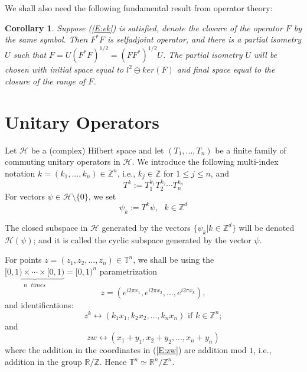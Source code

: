 \documentclass{birkmult}
\newtheorem{cor}[thm]{Corollary}
\theoremstyle{definition}
\theoremstyle{remark}
\numberwithin{equation}{section}
\begin{document}
We shall also need the following fundamental result from operator theory:
\begin{cor}
Suppose (\ref{E:ek}) is satisfied, denote the closure of the operator $F$
by the same symbol.  Then $F^{*}F$ is selfadjoint operator, and there is a 
partial isometry $U$ such that $F=U(F^{*}F)^{1/2}=(FF^{*})^{1/2}U$.  The 
partial isometry $U$ will be chosen with initial space equal to 
$l^{2} \ominus ker(F)$ and final space equal to the closure of the range 
of $F$. 
\end{cor}

\section{Unitary Operators}
\label{sec:3}

Let $\mathcal{H}$ be a (complex) Hilbert space and let $(T_{1}, ..., T_{n})$
be a finite family of commuting unitary operators in $\mathcal{H}$.  We
introduce the following multi-index notation 
$k=(k_{1}, ..., k_{n}) \in \mathbb{Z}^{n}$, i.e., $k_{j} \in \mathbb{Z}$ for
$1 \leq j \leq n$, and 
\begin{equation}
\label{E:T}
  T^{k} := T_{1}^{k_{1}}T_{2}^{k_{2}} \cdots T_{n}^{k_{n}}
\end{equation}
For vectors $\psi \in \mathcal{H} \setminus \{0\}$, we set 
\begin{equation}
\label{E:psi}
  \psi_{k} := T^{k}\psi, \text{  }k \in \mathbb{Z}^{d}
\end{equation}

The closed subspace in $\mathcal{H}$ generated by the vectors 
$\{\psi_{k} | k \in \mathbb{Z}^{d}\}$ will be denoted $\mathcal{H}(\psi)$;
and it is called the cyclic subspace generated by the vector $\psi$.

For points $z=(z_{1}, z_{2}, ..., z_{n}) \in \mathbb{T}^{n}$, we shall be
using the 
$\underbrace{[0,1) \times \cdots \times [0,1)}_{n \text{  } times} = [0,1)^{n}$ 
parametrization 
\begin{equation}
\label{E:zpara}
  z=(e^{i2\pi x_{1}}, e^{i2\pi x_{2}}, ..., e^{i2\pi x_{k}}),
\end{equation}  
and identifications:
\[
  z^{k} \longleftrightarrow (k_{1}x_{1}, k_{2}x_{2}, ..., k_{n}x_{n}) 
  \text{ if } k\in \mathbb{Z}^{n};
\]
and 
\begin{equation}
\label{E:zw}
  zw \longleftrightarrow (x_{1}+y_{1}, x_{2}+y_{2}, ..., x_{n}+y_{n})
\end{equation}  
where the addition in the coordinates in (\ref{E:zw}) are addition mod $1$,
i.e., addition in the group $\mathbb{R}/\mathbb{Z}$.  Hence 
$\mathbb{T}^{n} \simeq \mathbb{R}^{n}/\mathbb{Z}^{n}$.
\end{document}
